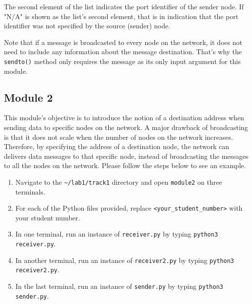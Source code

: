 \documentclass[11pt]{article}
\begin{document}
The second element of the list indicates the port identifier of the sender node.
If "N/A" is shown as the list's second element, that is in indication that the port identifier was not specified by the source (sender) node.

Note that if a message is broadcasted to every node on the network, it does not need to include any information about the message destination.
That's why the \texttt{sendto()} method only requires the message as its only input argument for this module.


\subsection{Module 2}
\label{subsec:module2}
This module's objective is to introduce the notion of a destination address when sending data to specific nodes on the network.
A major drawback of broadcasting is that it does not scale when the number of nodes on the network increases. Therefore, by specifying the address of a destination node, the network can delivers data messages to that specific node, instead of broadcasting the messages to all the nodes on the network. Please follow the steps below to see an example.


\begin{enumerate}
    \item Navigate to the \texttt{\textasciitilde/lab1/track1} directory and open \texttt{module2} on three terminals.
    \item For each of the Python files provided, replace \texttt{<your\_student\_number>} with your student number.
    \item In one terminal, run an instance of \texttt{receiver.py} by typing \texttt{python3 receiver.py}.
    \item In another terminal, run an instance of \texttt{receiver2.py} by typing \texttt{python3 receiver2.py}.
    \item In the last terminal, run an instance of \texttt{sender.py} by typing \texttt{python3 sender.py}.
\end{enumerate}
\end{document}
